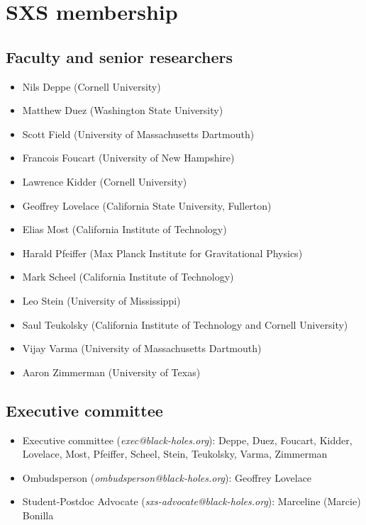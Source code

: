 \documentclass[12pt]{article}
\begin{document}
\section{SXS membership}
\subsection{Faculty and senior researchers}\label{sec:member_faculty}

\begin{itemize}
  \setlength\itemsep{-0.25em}
\item Nils Deppe (Cornell University)
\item Matthew Duez (Washington State University)
\item Scott Field (University of Massachusetts Dartmouth)
\item Francois Foucart (University of New Hampshire)
\item Lawrence Kidder (Cornell University)
\item Geoffrey Lovelace (California State University, Fullerton)
\item Elias Most (California Institute of Technology)
\item Harald Pfeiffer (Max Planck Institute for Gravitational Physics)
\item Mark Scheel (California Institute of Technology)
\item Leo Stein (University of Mississippi)
\item Saul Teukolsky (California Institute of Technology and Cornell University)
\item Vijay Varma (University of Massachusetts Dartmouth)
\item Aaron Zimmerman (University of Texas)
\end{itemize}

\subsection{Executive committee}\label{sec:executive_committee_members}
\begin{itemize}
  \setlength\itemsep{-0.25em}
\item Executive committee (\emph{exec@black-holes.org}): Deppe, Duez,
  Foucart, Kidder, Lovelace, Most, Pfeiffer, Scheel, Stein, Teukolsky,
  Varma, Zimmerman
\item Ombudsperson (\emph{ombudsperson@black-holes.org}): Geoffrey Lovelace
\item Student-Postdoc Advocate (\emph{sxs-advocate@black-holes.org}):
  Marceline (Marcie) Bonilla
\end{itemize}
\end{document}
